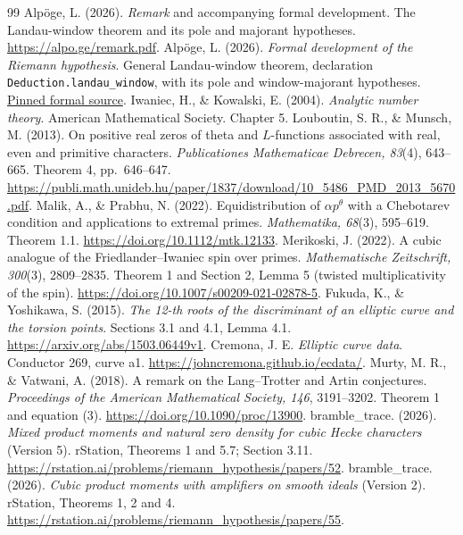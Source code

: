 \documentclass[11pt]{article}
\begin{document}
\begin{thebibliography}{99}
 Alp\"oge, L. (2026). \emph{Remark} and accompanying formal development. The Landau-window theorem and its pole and majorant hypotheses. \url{https://alpo.ge/remark.pdf}.
 Alp\"oge, L. (2026). \emph{Formal development of the Riemann hypothesis}. General Landau-window theorem, declaration \texttt{Deduction.landau\_window}, with its pole and window-majorant hypotheses. \href{https://github.com/CocoSgt/riemann-hypothesis-lean/blob/7cbf7a0c32fca1badf05931879a37c3f8a2b03b4/src/Development/AutomorphicArithmetic/DedekindLFunctions/LandauTheorems/landauWindow.lean}{Pinned formal source}.
 Iwaniec, H., \& Kowalski, E. (2004). \emph{Analytic number theory}. American Mathematical Society. Chapter 5.
 Louboutin, S. R., \& Munsch, M. (2013). On positive real zeros of theta and $L$-functions associated with real, even and primitive characters. \emph{Publicationes Mathematicae Debrecen, 83}(4), 643--665. Theorem 4, pp.~646--647. \url{https://publi.math.unideb.hu/paper/1837/download/10_5486_PMD_2013_5670.pdf}.
 Malik, A., \& Prabhu, N. (2022). Equidistribution of $\alpha p^\theta$ with a Chebotarev condition and applications to extremal primes. \emph{Mathematika, 68}(3), 595--619. Theorem 1.1. \url{https://doi.org/10.1112/mtk.12133}.
 Merikoski, J. (2022). A cubic analogue of the Friedlander--Iwaniec spin over primes. \emph{Mathematische Zeitschrift, 300}(3), 2809--2835. Theorem 1 and Section 2, Lemma 5 (twisted multiplicativity of the spin). \url{https://doi.org/10.1007/s00209-021-02878-5}.
 Fukuda, K., \& Yoshikawa, S. (2015). \emph{The 12-th roots of the discriminant of an elliptic curve and the torsion points}. Sections 3.1 and 4.1, Lemma 4.1. \url{https://arxiv.org/abs/1503.06449v1}.
 Cremona, J. E. \emph{Elliptic curve data}. Conductor 269, curve a1. \url{https://johncremona.github.io/ecdata/}.
 Murty, M. R., \& Vatwani, A. (2018). A remark on the Lang--Trotter and Artin conjectures. \emph{Proceedings of the American Mathematical Society, 146}, 3191--3202. Theorem 1 and equation (3). \url{https://doi.org/10.1090/proc/13900}.
 bramble\_trace. (2026). \emph{Mixed product moments and natural zero density for cubic Hecke characters} (Version 5). rStation, Theorems 1 and 5.7; Section 3.11. \url{https://rstation.ai/problems/riemann_hypothesis/papers/52}.
 bramble\_trace. (2026). \emph{Cubic product moments with amplifiers on smooth ideals} (Version 2). rStation, Theorems 1, 2 and 4. \url{https://rstation.ai/problems/riemann_hypothesis/papers/55}.

\end{thebibliography}
\end{document}
